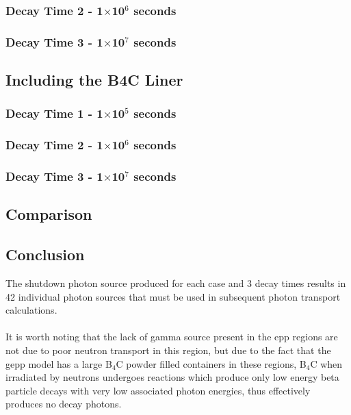 \documentclass[12pt]{article}
\begin{document}
\subsubsection{Decay Time 2 - 1$\times$10$^{6}$ seconds}

\clearpage
\subsubsection{Decay Time 3 - 1$\times$10$^{7}$ seconds}

\clearpage
\subsection{Including the B4C Liner}
\subsubsection{Decay Time 1 - 1$\times$10$^{5}$ seconds}

\clearpage
\subsubsection{Decay Time 2 - 1$\times$10$^{6}$ seconds}

\clearpage
\subsubsection{Decay Time 3 - 1$\times$10$^{7}$ seconds}

\clearpage
\subsection{Comparison}
\subsection{Conclusion}
The shutdown photon source produced for each case and 3 decay times results in
42 individual photon sources that must be used in subsequent photon transport
calculations.
\\
\\
It is worth noting that the lack of gamma source present in the \gls{epp}
regions are not due to poor neutron transport in this region, but due to the
fact that the \gls{gepp} model has a large B$_4$C powder filled containers
in these regions, B$_4$C when irradiated by neutrons undergoes reactions
which produce only low energy beta particle decays with very low associated
photon energies, thus effectively produces no decay photons.
\newpage
\clearpage
\end{document}
